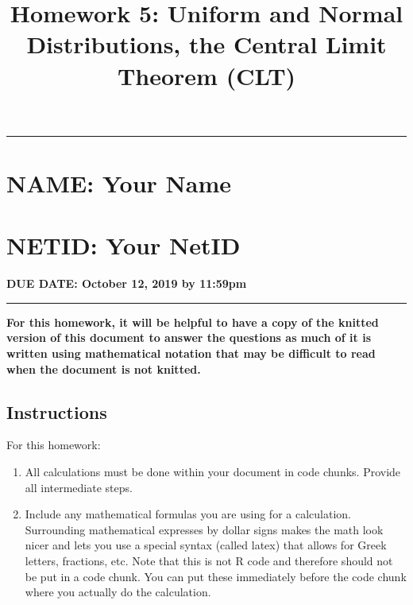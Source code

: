 \documentclass[]{article}
\title{Homework 5: Uniform and Normal Distributions, the Central Limit Theorem
(CLT)}
\author{}
\date{}
\begin{document}
\maketitle

\begin{center}\rule{0.5\linewidth}{\linethickness}\end{center}

\hypertarget{name-your-name}{%
\section{NAME: Your Name}\label{name-your-name}}

\hypertarget{netid-your-netid}{%
\section{NETID: Your NetID}\label{netid-your-netid}}

\textbf{DUE DATE: October 12, 2019 by 11:59pm}

\begin{center}\rule{0.5\linewidth}{\linethickness}\end{center}

\textbf{For this homework, it will be helpful to have a copy of the
knitted version of this document to answer the questions as much of it
is written using mathematical notation that may be difficult to read
when the document is not knitted.}

\hypertarget{instructions}{%
\subsection{Instructions}\label{instructions}}

For this homework:

\begin{enumerate}
\def\labelenumi{\arabic{enumi}.}
\item
  All calculations must be done within your document in code chunks.
  Provide all intermediate steps.
\item
  Include any mathematical formulas you are using for a calculation.
  Surrounding mathematical expresses by dollar signs makes the math look
  nicer and lets you use a special syntax (called latex) that allows for
  Greek letters, fractions, etc. Note that this is not R code and
  therefore should not be put in a code chunk. You can put these
  immediately before the code chunk where you actually do the
  calculation.
\end{enumerate}
\end{document}
